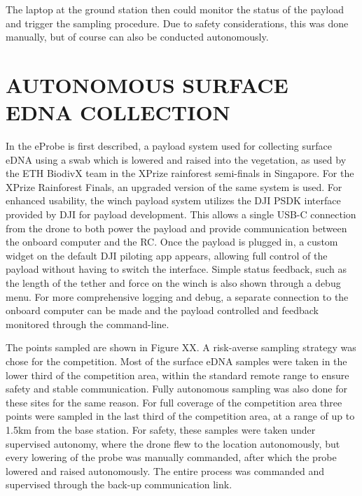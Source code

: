 The laptop at the ground station then could monitor the status of the payload and trigger the sampling procedure. Due to safety considerations, this was done manually, but of course can also be conducted autonomously.


    \section{AUTONOMOUS SURFACE EDNA COLLECTION}


    In \cite{Kirchgeorg2024} the eProbe is first described, a payload system used for collecting surface eDNA using a swab which is lowered and raised into the vegetation, as used by the ETH BiodivX team in the XPrize rainforest semi-finals in Singapore. For the XPrize Rainforest Finals, an upgraded version of the same system is used. 
    For enhanced usability, the winch payload system utilizes the DJI PSDK interface provided by DJI for payload development. This allows a single USB-C connection from the drone to both power the payload and provide communication between the onboard computer and the RC. Once the payload is plugged in, a custom widget on the default DJI piloting app appears, allowing full control of the payload without having to switch the interface. Simple status feedback, such as the length of the tether and force on the winch is also shown through a debug menu. For more comprehensive logging and debug, a separate connection to the onboard computer can be made and the payload controlled and feedback monitored through the command-line. 
    

    The points sampled are shown in Figure XX. A risk-averse sampling strategy was chose for the competition. Most of the surface eDNA samples were taken in the lower third of the competition area, within the standard remote range to ensure safety and stable communication. Fully autonomous sampling was also done for these sites for the same reason. For full coverage of the competition area three points were sampled in the last third of the competition area, at a range of up to 1.5km from the base station. For safety, these samples were taken under supervised autonomy, where the drone flew to the location autonomously, but every lowering of the probe was manually commanded, after which the probe lowered and raised autonomously. The entire process was commanded and supervised through the back-up communication link. 

